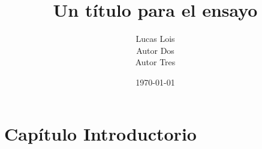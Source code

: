 \documentclass[12pt]{report}
\title{Un título para el ensayo}
\author{
	Lucas Lois\\
	Autor Dos\\
	Autor Tres
}
\date{\today}
\begin{document}

\tableofcontents
\chapter{Capítulo Introductorio}

\blindtext

\pagebreak
\printbibliography{}
\end{document}

